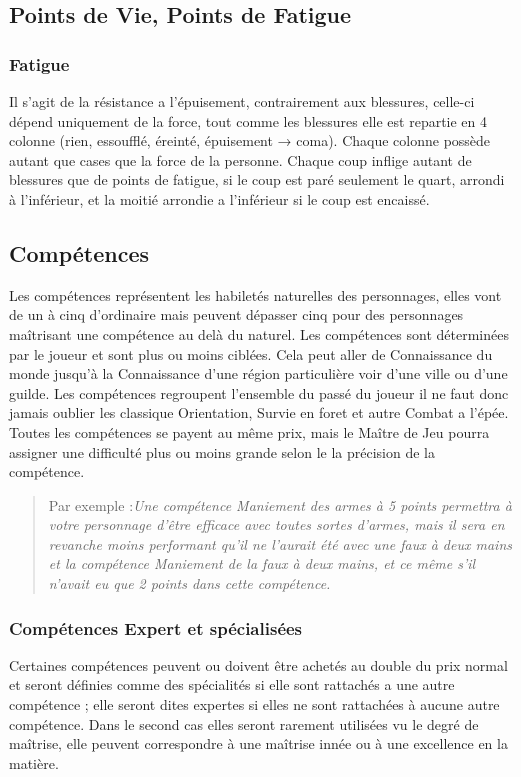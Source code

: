 \subsection{Points de Vie, Points de Fatigue}
\subsubsection{Fatigue}
Il s’agit de la résistance a l'épuisement, contrairement aux blessures, 
celle-ci dépend uniquement de la force, tout comme les blessures elle est repartie en 4 colonne (rien, essoufflé, éreinté, épuisement → coma). 
Chaque colonne possède autant que cases que la force de la personne.
Chaque coup inflige autant de blessures que de points de fatigue, si le coup est paré seulement le quart, 
arrondi à l'inférieur, et la moitié arrondie a l'inférieur si le coup est encaissé.
\subsection{Compétences}
Les compétences représentent les habiletés naturelles des personnages, 
elles vont de un à cinq d'ordinaire mais peuvent dépasser cinq pour des personnages maîtrisant une compétence au delà du naturel. 
Les compétences sont déterminées par le joueur et sont plus ou moins ciblées. 
Cela peut aller de Connaissance du monde jusqu'à la Connaissance d'une région particulière voir d'une ville ou d'une guilde. 
Les compétences regroupent l'ensemble du passé du joueur il ne faut donc jamais oublier les classique Orientation, 
Survie en foret et autre Combat a l'épée.\\
Toutes les compétences se payent au même prix, 
mais le Maître de Jeu pourra assigner une difficulté plus ou moins grande selon le la précision de la compétence.

\begin{quote}
Par exemple :\it Une compétence Maniement des armes à 5 points permettra à votre personnage d'être efficace avec toutes sortes d'armes, 
mais il sera en revanche moins performant qu'il ne l'aurait été avec une faux à deux mains et la compétence Maniement de la faux à deux mains, 
et ce même s'il n'avait eu que 2 points dans cette compétence.
\end{quote} 

\subsubsection{Compétences Expert et spécialisées}
Certaines compétences peuvent ou doivent être achetés au double du prix normal et seront définies comme des spécialités 
si elle sont rattachés a une autre compétence ; elle seront dites expertes si elles ne sont rattachées à aucune autre compétence. 
Dans le second cas elles seront rarement utilisées vu le degré de maîtrise, elle peuvent correspondre à une maîtrise innée ou à une excellence en la matière.

